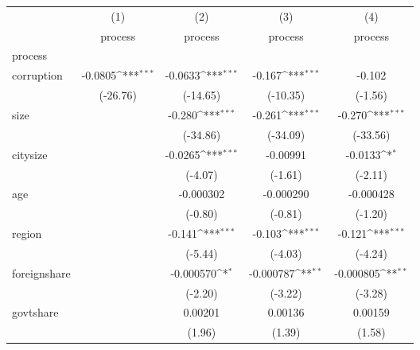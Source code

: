 {
\def\sym#1{\ifmmode^{#1}\else\(^{#1}\)\fi}
\begin{tabular}{l*{4}{c}}
\hline\hline
            &\multicolumn{1}{c}{(1)}&\multicolumn{1}{c}{(2)}&\multicolumn{1}{c}{(3)}&\multicolumn{1}{c}{(4)}\\
            &\multicolumn{1}{c}{process}&\multicolumn{1}{c}{process}&\multicolumn{1}{c}{process}&\multicolumn{1}{c}{process}\\
\hline
process     &                     &                     &                     &                     \\
corruption  &     -0.0805\sym{***}&     -0.0633\sym{***}&      -0.167\sym{***}&      -0.102         \\
            &    (-26.76)         &    (-14.65)         &    (-10.35)         &     (-1.56)         \\
[1em]
size        &                     &      -0.280\sym{***}&      -0.261\sym{***}&      -0.270\sym{***}\\
            &                     &    (-34.86)         &    (-34.09)         &    (-33.56)         \\
[1em]
citysize    &                     &     -0.0265\sym{***}&    -0.00991         &     -0.0133\sym{*}  \\
            &                     &     (-4.07)         &     (-1.61)         &     (-2.11)         \\
[1em]
age         &                     &   -0.000302         &   -0.000290         &   -0.000428         \\
            &                     &     (-0.80)         &     (-0.81)         &     (-1.20)         \\
[1em]
region      &                     &      -0.141\sym{***}&      -0.103\sym{***}&      -0.121\sym{***}\\
            &                     &     (-5.44)         &     (-4.03)         &     (-4.24)         \\
[1em]
foreignshare&                     &   -0.000570\sym{*}  &   -0.000787\sym{**} &   -0.000805\sym{**} \\
            &                     &     (-2.20)         &     (-3.22)         &     (-3.28)         \\
[1em]
govtshare   &                     &     0.00201         &     0.00136         &     0.00159         \\
            &                     &      (1.96)         &      (1.39)         &      (1.58)         \\

\end{tabular}}
